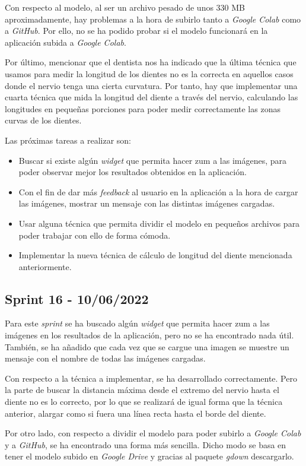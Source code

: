 Con respecto al modelo, al ser un archivo pesado de unos 330 MB aproximadamente, hay problemas a la hora de subirlo tanto a \emph{Google Colab} como a \emph{GitHub}. Por ello, no se ha podido probar si el modelo funcionará en la aplicación subida a \emph{Google Colab}.

Por último, mencionar que el dentista nos ha indicado que la última técnica que usamos para medir la longitud de los dientes no es la correcta en aquellos casos donde el nervio tenga una cierta curvatura. Por tanto, hay que implementar una cuarta técnica que mida la longitud del diente a través del nervio, calculando las longitudes en pequeñas porciones para poder medir correctamente las zonas curvas de los dientes.

Las próximas tareas a realizar son:
\begin{itemize}
    \item Buscar si existe algún \emph{widget} que permita hacer zum a las imágenes, para poder observar mejor los resultados obtenidos en la aplicación.
    \item Con el fin de dar más \emph{feedback} al usuario en la aplicación a la hora de cargar las imágenes, mostrar un mensaje con las distintas imágenes cargadas.
    \item Usar alguna técnica que permita dividir el modelo en pequeños archivos para poder trabajar con ello de forma cómoda.
    \item Implementar la nueva técnica de cálculo de longitud del diente mencionada anteriormente.
\end{itemize}
\subsection{Sprint 16 - 10/06/2022}
Para este \emph{sprint} se ha buscado algún \emph{widget} que permita hacer zum a las imágenes en los resultados de la aplicación, pero no se ha encontrado nada útil. También, se ha añadido que cada vez que se cargue una imagen se muestre un mensaje con el nombre de todas las imágenes cargadas.

Con respecto a la técnica a implementar, se ha desarrollado correctamente. Pero la parte de buscar la distancia máxima desde el extremo del nervio hasta el diente no es lo correcto, por lo que se realizará de igual forma que la técnica anterior, alargar como si fuera una línea recta hasta el borde del diente.

Por otro lado, con respecto a dividir el modelo para poder subirlo a \emph{Google Colab} y a \emph{GitHub}, se ha encontrado una forma más sencilla. Dicho modo se basa en tener el modelo subido en \emph{Google Drive} y gracias al paquete \emph{gdown} descargarlo.

